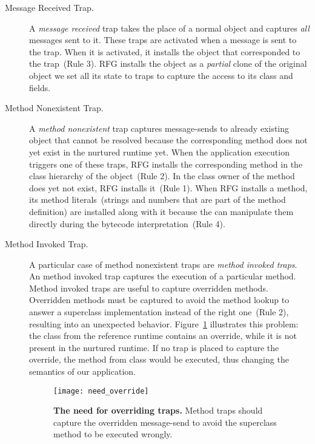 \begin{description}
\item[Message Received Trap.] A \emph{message received} trap takes the place of a normal object and captures \emph{all} messages sent to it. These traps are activated when a message is sent to the trap. When it is activated, it installs the object that corresponded to the trap~(Rule 3). RFG installs the object as a \emph{partial} clone of the original object \ie we set all its state to traps to capture the access to its class and fields.%

\item[Method Nonexistent Trap.] A \emph{method nonexistent} trap captures message-sends to already existing object that cannot be resolved because the corresponding method does not yet exist in the nurtured runtime yet. When the application execution triggers one of these traps, RFG installs the corresponding method in the class hierarchy of the object~(Rule 2). In the class owner of the method does yet not exist, RFG installs it~(Rule 1). When RFG installs a method, its method literals~(\eg strings and numbers that are part of the method definition) are installed along with it because the \VM can manipulate them directly during the bytecode interpretation~(Rule 4).

\item[Method Invoked Trap.] A particular case of method nonexistent traps are \emph{method invoked traps}. An method invoked trap captures the execution of a particular method. Method invoked traps are useful to capture overridden methods. Overridden methods must be captured to avoid the method lookup to answer a superclass implementation instead of the right one~(Rule 2), resulting into an unexpected behavior. Figure~\ref{fig:need_override} illustrates this problem: the class  from the reference runtime contains an override, while it is not present in the nurtured runtime. If no trap is placed to capture the override, the method  from class  would be executed, thus changing the semantics of our application.

\begin{figure}[ht]
\begin{center}
\texttt{[image: need\_override]}
\caption{\textbf{The need for overriding traps.} Method traps should capture the overridden  message-send to avoid the superclass method to be executed wrongly.\label{fig:need_override}}
\end{center}
\end{figure}

\end{description}

